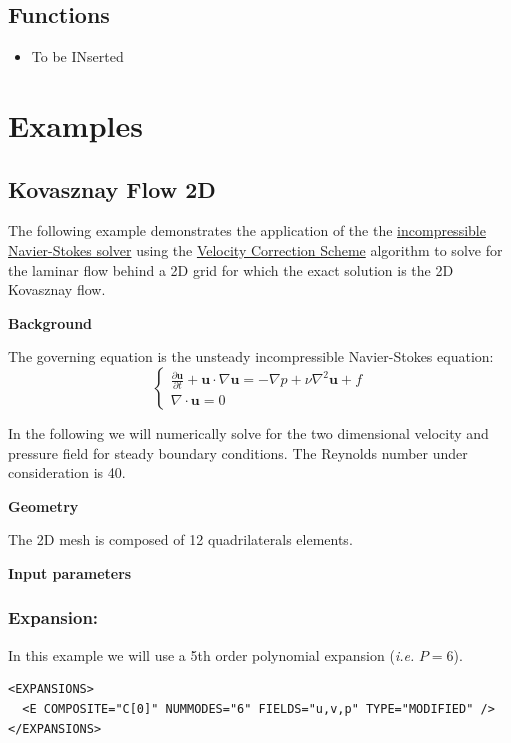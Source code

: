  \subsection{Functions}
 
 \begin{itemize}
 \item To be INserted
 \end{itemize}
 
 
 
\section{Examples}

\subsection{Kovasznay Flow 2D}
\label{KovasznayFlow2D}
The following example demonstrates the application of the the \hyperref[IncNSsolver]{incompressible Navier-Stokes solver} using the \hyperref[VCSscheme]{Velocity Correction Scheme} algorithm to solve for the laminar flow behind a 2D grid for which the exact solution is the 2D Kovasznay flow.

\textbf{Background}

The governing equation is the unsteady incompressible Navier-Stokes equation:
\begin{equation}
\begin{cases}
\frac{\partial \textbf{u}}{\partial t} + \textbf{u} \cdot \nabla \textbf{u} = - \nabla p + \nu \nabla^2 \textbf{u} + f \\
\nabla \cdot \textbf{u} = 0
\end{cases}
\end{equation}

In the following we will numerically solve for the two dimensional velocity and pressure field for steady boundary conditions. The Reynolds number under consideration is 40.

\textbf{Geometry}

The 2D mesh is composed of 12 quadrilaterals elements.

\textbf{Input parameters}

\subsubsection{Expansion:~}
In this example we will use a 5th order polynomial expansion (\textit{i.e.} $P=6$).
\begin{lstlisting}[style=XMLStyle]
<EXPANSIONS>
  <E COMPOSITE="C[0]" NUMMODES="6" FIELDS="u,v,p" TYPE="MODIFIED" />
</EXPANSIONS>
\end{lstlisting}

